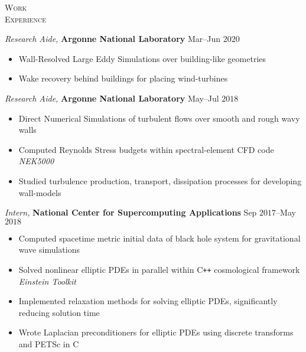 \documentclass[10pt]{article}
\begin{document}
\begin{multicols}{2}
\textsc{\small Work \\ Experience}
\columnbreak

{\sl Research Aide,} \textbf{Argonne National Laboratory} \hfill Mar--Jun $2020$

\vspace{-1.75em}
\begin{itemize}[label=-]
    \setlength\itemsep{-0.25em}
    \item Wall-Resolved Large Eddy Simulations over building-like geometries
    \item Wake recovery behind buildings for placing wind-turbines
\end{itemize}
\vspace{-2.0em}

\vspace{0.5em}
%
{\sl Research Aide,} \textbf{Argonne National Laboratory} \hfill May--Jul $2018$

\vspace{-1.75em}
\begin{itemize}[label=-]
    \setlength\itemsep{-0.25em}
    \item Direct Numerical Simulations of turbulent flows over smooth and rough wavy walls
    \item Computed Reynolds Stress budgets within spectral-element CFD code \textit{NEK5000}
    \item Studied turbulence production, transport, dissipation processes for developing wall-models
\end{itemize}
\vspace{-2.0em}

\vspace{0.5em}
%
{\sl Intern,} \textbf{National Center for Supercomputing Applications} \hfill Sep $2017$--May $2018$

\vspace{-1.75em}
\begin{itemize}[label=-]
    \setlength\itemsep{-0.25em}
    \item Computed spacetime metric initial data of black hole system for gravitational wave simulations
    \item Solved nonlinear elliptic PDEs in parallel within C\texttt{++} cosmological framework \textit{Einstein Toolkit}
    \item Implemented relaxation methods for solving elliptic PDEs, significantly reducing solution time
    \item Wrote Laplacian preconditioners for elliptic PDEs using discrete transforms and PETSc in C
\end{itemize}
\vspace{-2.0em}


\end{multicols}
\end{document}
